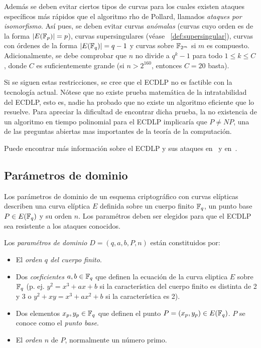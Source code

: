 Además se deben evitar ciertos tipos de curvas para los cuales existen ataques específicos más rápidos que el algoritmo rho de Pollard, llamados \emph{ataques por isomorfismo}. Así pues, se deben evitar curvas \emph{anómalas} (curvas cuyo orden es de la forma $|E(\mathbb{F}_p)| = p$), curvas supersingulares (véase ~\ref{def:supersingular}), curvas con órdenes de la forma $|E(\mathbb{F}_q)| = q - 1$ y curvas sobre $\mathbb{F}_{2^m}$ si $m$ es compuesto. Adicionalmente, se debe comprobar que $n$ no divide a $q^k - 1$ para todo $1 \le k \le C$, donde $C$ es suficientemente grande (si $n > 2^{160}$, entonces $C = 20$ basta).

Si se siguen estas restricciones, se cree que el ECDLP no es factible con la tecnología actual. Nótese que no existe prueba matemática de la intratabilidad del ECDLP, esto es, nadie ha probado que no existe un algoritmo eficiente que lo resuelve. Para apreciar la dificultad de encontrar dicha prueba, la no existencia de un algoritmo en tiempo polinomial para el ECDLP implicaría que $P \neq NP$, una de las preguntas abiertas mas importantes de la teoría de la computación.

Puede encontrar más información sobre el ECDLP y sus ataques en~\cite[cap. 4]{Hankerson:2003} y en~\cite[cap. 4]{Washington:2008}.

\subsection{Parámetros de dominio}
\label{sub:Parámetros de dominio}

Los parámetros de dominio de un esquema criptográfico con curvas elípticas describen una curva elíptica $E$ definida sobre un cuerpo finito $\mathbb{F}_q$, un punto base $P \in E(\mathbb{F}_q)$ y su orden $n$. Los paramétros deben ser elegidos para que el ECDLP sea resistente a los ataques conocidos.

\begin{definicion}\label{def:parámetros de dominio}
    Los \emph{paramétros de dominio} $D = (q, a, b, P, n)$ están constituidos por:
    \begin{itemize}
        \item El \emph{orden $q$ del cuerpo finito}.
        \item Dos \emph{coeficientes} $a, b \in \mathbb{F}_q$ que definen la ecuación de la curva eliptica $E$ sobre $\mathbb{F}_q$ (p. ej. $y^2 = x^3 + a x + b$ si la característica del cuerpo finito es distinta de 2 y 3 o $y^2 + x y = x^3 + a x^2 + b$ si la característica es 2).
        \item Dos elementos $x_p, y_p \in \mathbb{F}_q$ que definen el punto $P = (x_p, y_p) \in E(\mathbb{F}_q)$. $P$ se conoce como el \emph{punto base}.
        \item El \emph{orden $n$} de $P$, normalmente un número primo.
    \end{itemize}
\end{definicion}

